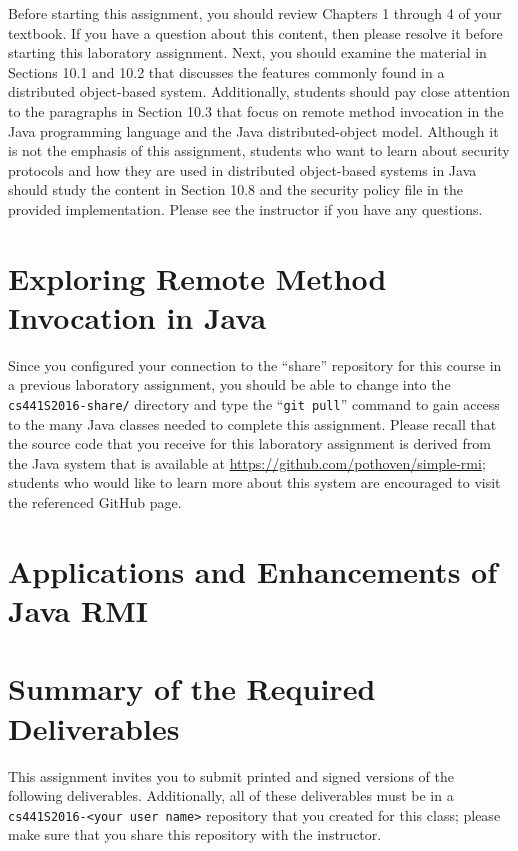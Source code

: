 Before starting this assignment, you should review Chapters 1 through 4 of your textbook. If you have a question about
this content, then please resolve it before starting this laboratory assignment. Next, you should examine the material
in Sections 10.1 and 10.2 that discusses the features commonly found in a distributed object-based system. Additionally,
students should pay close attention to the paragraphs in Section 10.3 that focus on remote method invocation in the Java
programming language and the Java distributed-object model. Although it is not the emphasis of this assignment, students
who want to learn about security protocols and how they are used in distributed object-based systems in Java should
study the content in Section 10.8 and the security policy file in the provided implementation.  Please see the
instructor if you have any questions.

\section*{Exploring Remote Method Invocation in Java}

Since you configured your connection to the ``share'' repository for this course in a previous laboratory assignment,
you should be able to change into the {\tt cs441S2016-share/} directory and type the ``{\tt git pull}'' command to gain
access to the many Java classes needed to complete this assignment. Please recall that the source code that you receive
for this laboratory assignment is derived from the Java system that is available at
\url{https://github.com/pothoven/simple-rmi}; students who would like to learn more about this system are encouraged to
visit the referenced GitHub page.

\section*{Applications and Enhancements of Java RMI}

\section*{Summary of the Required Deliverables}

This assignment invites you to submit printed and signed versions of the following deliverables. Additionally,
all of these deliverables must be in a {\tt cs441S2016-<your user name>} repository that you created for this class;
please make sure that you share this repository with the instructor.

